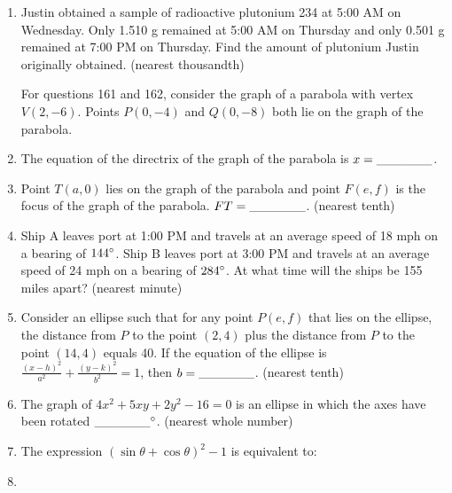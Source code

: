\documentclass[../uilmath.tex]{subfiles}
\begin{document}
\begin{enumerate}[label=\bfseries\arabic*.]
    \item %
    Justin obtained a sample of radioactive plutonium 234 at 5:00 AM on Wednesday. Only 1.510 g remained at 5:00 AM on Thursday and only 0.501 g remained at 7:00 PM on Thursday. Find the amount of plutonium Justin originally obtained. (nearest thousandth)
    

    For questions 161 and 162, consider the graph of a parabola with vertex $V(2,-6)$. Points $P(0,-4)$ and $Q(0,-8)$ both lie on the graph of the parabola.
    \item %
    The equation of the directrix of the graph of the parabola is $x=\_\_\_\_\_\_$.

    \item %
    Point $T(a,0)$ lies on the graph of the parabola and point $F(e,f)$ is the focus of the graph of the parabola. $FT=\_\_\_\_\_\_$. (nearest tenth)

    \item %
    Ship A leaves port at 1:00 PM and travels at an average speed of 18 mph on a bearing of $144\degree$. Ship B leaves port at 3:00 PM and travels at an average speed of 24 mph on a bearing of $284\degree$. At what time will the ships be 155 miles apart? (nearest minute)
    
    \item %
    Consider an ellipse such that for any point $P(e,f)$ that lies on the ellipse, the distance from $P$ to the point $(2,4)$ plus the distance from $P$ to the point $(14,4)$ equals 40. If the equation of the ellipse is $\frac{(x-h)^2}{a^2}+\frac{(y-k)^2}{b^2}=1$, then $b=\_\_\_\_\_\_$. (nearest tenth)

    \item %
    The graph of $4x^2+5xy+2y^2-16=0$ is an ellipse in which the axes have been rotated $\_\_\_\_\_\_\degree$. (nearest whole number)

    \item %
    The expression $(\sin\theta + \cos\theta)^2-1$ is equivalent to:

    \item %
    

\end{enumerate}
\end{document}
